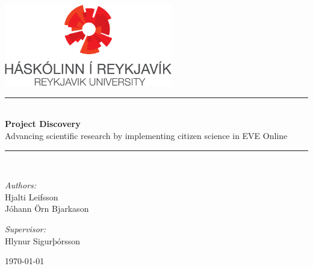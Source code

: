  \newcommand{\HRule}{\rule{\linewidth}{0.5mm}}
\begin{titlepage}

\begin{center}
\includegraphics[width=0.55\textwidth]{./graphics/rulogo}\\[4.0cm]    


\HRule \\[0.4cm]
{ \Huge \bfseries Project Discovery}\\[0.2cm]

\Large Advancing scientific research by implementing citizen science in EVE Online\\[0.1cm]

\HRule \\[1.5cm]


\begin{minipage}{0.49\textwidth}
\begin{flushleft} \large
\emph{Authors:}\\
Hjalti Leifsson \\
Jóhann Örn Bjarkason
\end{flushleft}
\end{minipage}
\begin{minipage}{0.49\textwidth}
\begin{flushright} \large
\emph{Supervisor:} \\
Hlynur Sigurþórsson
\end{flushright}
\end{minipage}

\vfill

{\large \today}



\end{center}

\end{titlepage}